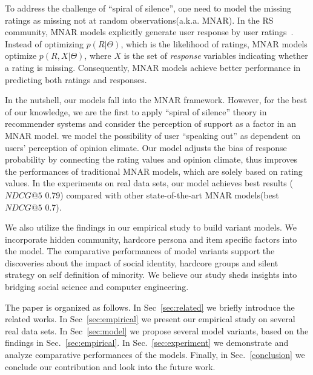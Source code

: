 \documentclass{sig-alternate}
\begin{document}
To address the challenge of ``spiral of silence'', one need to model the missing ratings as missing not at random observations(a.k.a. MNAR). In the RS community,  MNAR models explicitly generate user response by user ratings~\cite{Hernandez-Lobato2014Probabilistic,Steck2010Training,Marlin2009Collaborative}. Instead of optimizing $p(R|\Theta)$, which is the likelihood of ratings, MNAR models optimize $p(R,X|\Theta)$, where $X$ is the set of \textit{response} variables indicating whether a rating is missing. Consequently, MNAR models achieve better performance in predicting both ratings and responses.

In the nutshell, our models fall into the MNAR framework. However, for the best of our knowledge, we are the first to apply ``spiral of silence'' theory in recommender systems and consider the perception of support as a factor in an MNAR model. we model the possibility of user ``speaking out'' as dependent on users' perception of opinion climate.  Our model adjusts the bias of response probability by connecting the rating values and opinion climate, thus improves the performances of traditional MNAR models, which are solely based on rating values.  In the experiments on real data sets, our model achieves best results ($NDCG@5$ 0.79) compared with other state-of-the-art MNAR models(best $NDCG@5$ 0.7).

We also utilize the findings in our empirical study to build variant models. We incorporate hidden community, hardcore persona and item specific factors into the model. The comparative performances of model variants support the discoveries about the impact of social identity, hardcore groups and silent strategy on self definition of minority. We believe our study sheds insights into bridging social science and computer engineering.

The paper is organized as follows. In Sec~\ref{sec:related} we briefly introduce the related works. In Sec~\ref{sec:empirical} we present our empirical study on several real data sets. In Sec~\ref{sec:model} we propose several model variants, based on the findings in Sec.~\ref{sec:empirical}. In Sec.~\ref{sec:experiment} we demonstrate and analyze comparative performances of the models. Finally, in Sec.~\ref{conclusion} we conclude our contribution and look into the future work.
\end{document}
